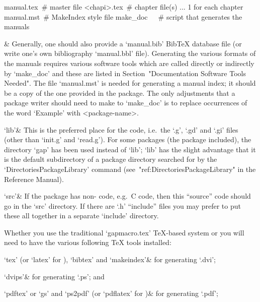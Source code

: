 manual.tex\ \# master file
<chapi>.tex\ \# chapter file(s) ... 1 for each chapter
manual.mst\ \# MakeIndex style file
make_doc\ \ \ \# script that generates the manuals

&
Generally, one should also provide a `manual.bib' Bib{\TeX} database file
(or write one's  own  bibliography  `manual.bbl'  file).  Generating  the
various formats of the manuals requires various software tools which  are
called directly or indirectly by  `make_doc'  and  these  are  listed  in
Section~"Documentation Software Tools Needed". The file  `manual.mst'  is
needed for generating a manual index; it should be  a  copy  of  the  one
provided in the {\Example} package. The only adjustments that  a  package
writer should need to make to `make_doc' is to replace occurrences of the
word `Example' with <package-name>.

`lib'&
This is the preferred place for the {\GAP} code, i.e.~the `.g', `.gd' and
`.gi' files (other than `init.g' and `read.g'). For  some  packages  (the
{\Example} package included), the directory `gap' has been  used  instead
of `lib';  `lib'  has  the  slight  advantage  that  it  is  the  default
subdirectory   of   a   package   directory   searched   for    by    the
`DirectoriesPackageLibrary' command  (see~"ref:DirectoriesPackageLibrary"
in the {\GAP} Reference Manual).

`src'&
If the package has non-{\GAP} code, e.g.~C  code,  then  this  ``source''
code should go in the `src' directory.  If  there  are  `.h'  ``include''
files you may prefer to put these all together in  a  separate  `include'
directory.

\enditems


Whether you use the traditional  `gapmacro.tex'  {\TeX}-based  system  or
 you will need to have the various following {\TeX} tools
installed:

\beginitems

`tex' (or `latex' for ), `bibtex' and `makeindex'&
for generating `.dvi';

`dvips'&
for generating `.ps'; and

`pdftex' or `gs' and `ps2pdf' (or `pdflatex' for )&
for generating `.pdf';

\enditems

